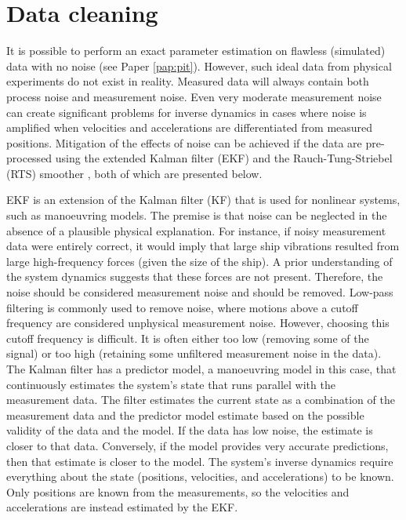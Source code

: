 \section{Data cleaning}
\label{sec:datacleaning}
It is possible to perform an exact parameter estimation on flawless (simulated) data with no noise (see Paper \ref{pap:pit}). However, such ideal data from physical experiments do not exist in reality. Measured data will always contain both process noise and measurement noise. Even very moderate measurement noise can create significant problems for inverse dynamics in cases where noise is amplified when velocities and accelerations are differentiated from measured positions.
Mitigation of the effects of noise can be achieved if the data are pre-processed using the extended Kalman filter (EKF) \cite{brownIntroductionRandomSignals1997} and the Rauch-Tung-Striebel (RTS) smoother \cite{rauchMaximumLikelihoodEstimates1965}, both of which are presented below.

EKF is an extension of the Kalman filter (KF) that is used for nonlinear systems, such as manoeuvring models. The premise is that noise can be neglected in the absence of a plausible physical explanation. For instance, if noisy measurement data were entirely correct, it would imply that large ship vibrations resulted from large high-frequency forces (given the size of the ship). A prior understanding of the system dynamics suggests that these forces are not present. Therefore, the noise should be considered measurement noise and should be removed. Low-pass filtering is commonly used to remove noise, where motions above a cutoff frequency are considered unphysical measurement noise. However, choosing this cutoff frequency is difficult. It is often  either too low (removing some of the signal) or too high (retaining some unfiltered measurement noise in the data). The Kalman filter has a predictor model, a manoeuvring model in this case, that continuously estimates the system’s state that runs parallel with the measurement data. The filter estimates the current state as a combination of the measurement data and the predictor model estimate based on the possible validity of the data and the model. If the data has low noise, the estimate is closer to that data. Conversely, if the model provides very accurate predictions, then that estimate is closer to the model.
The system’s inverse dynamics require everything about the state (positions, velocities, and accelerations) to be known. Only positions are known from the measurements, so the velocities and accelerations are instead estimated by the EKF.

